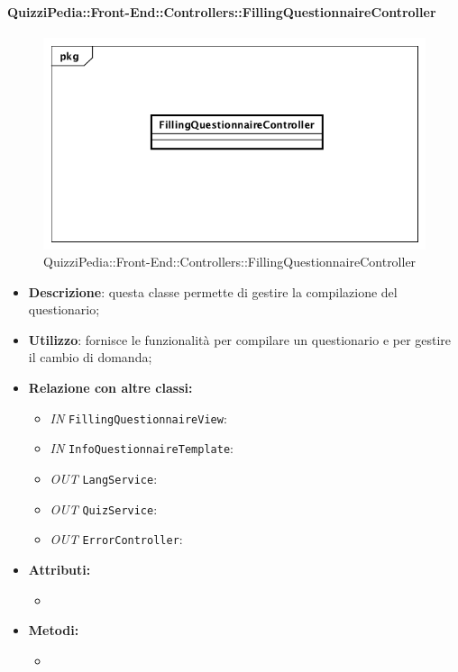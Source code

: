 \paragraph{QuizziPedia::Front-End::Controllers::FillingQuestionnaireController}
\begin{figure}
	\centering
	\includegraphics[scale=0.45]{UML/Classi/Front-End/QuizziPedia_Front-end_Controller_FillingQuestionnaireController.png}
	\caption{QuizziPedia::Front-End::Controllers::FillingQuestionnaireController}
\end{figure}
\begin{itemize}
	\item \textbf{Descrizione}: questa classe permette di gestire la compilazione del questionario;
	\item \textbf{Utilizzo}: fornisce le funzionalità per compilare un questionario e per gestire il cambio di domanda;
	\item \textbf{Relazione con altre classi:}
	\begin{itemize}
		\item \textit{IN} \texttt{FillingQuestionnaireView}:  
		\item \textit{IN} \texttt{InfoQuestionnaireTemplate}: 
		\item \textit{OUT} \texttt{LangService}: 
		\item \textit{OUT} \texttt{QuizService}: 
		\item \textit{OUT} \texttt{ErrorController}: 
	\end{itemize}
	\item \textbf{Attributi:}
	\begin{itemize}
		\item 
	\end{itemize}
	\item \textbf{Metodi:}
	\begin{itemize}
		\item 
	\end{itemize}
\end{itemize}

